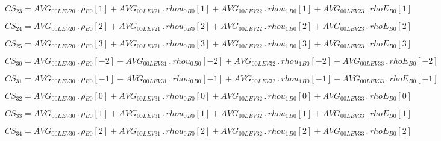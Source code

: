 \documentclass{article}
\begin{document}
\begin{dmath}CS_{23} = AVG_{0 0 LEV 20} \,.\, {\rho{_{B0}}}[{1}] + AVG_{0 0 LEV 21} \,.\, {rhou_{0}{_{B0}}}[{1}] + AVG_{0 0 LEV 22} \,.\, {rhou_{1}{_{B0}}}[{1}] + AVG_{0 0 LEV 23} \,.\, {rhoE{_{B0}}}[{1}]\end{dmath}

\begin{dmath}CS_{24} = AVG_{0 0 LEV 20} \,.\, {\rho{_{B0}}}[{2}] + AVG_{0 0 LEV 21} \,.\, {rhou_{0}{_{B0}}}[{2}] + AVG_{0 0 LEV 22} \,.\, {rhou_{1}{_{B0}}}[{2}] + AVG_{0 0 LEV 23} \,.\, {rhoE{_{B0}}}[{2}]\end{dmath}

\begin{dmath}CS_{25} = AVG_{0 0 LEV 20} \,.\, {\rho{_{B0}}}[{3}] + AVG_{0 0 LEV 21} \,.\, {rhou_{0}{_{B0}}}[{3}] + AVG_{0 0 LEV 22} \,.\, {rhou_{1}{_{B0}}}[{3}] + AVG_{0 0 LEV 23} \,.\, {rhoE{_{B0}}}[{3}]\end{dmath}

\begin{dmath}CS_{30} = AVG_{0 0 LEV 30} \,.\, {\rho{_{B0}}}[{-2}] + AVG_{0 0 LEV 31} \,.\, {rhou_{0}{_{B0}}}[{-2}] + AVG_{0 0 LEV 32} \,.\, {rhou_{1}{_{B0}}}[{-2}] + AVG_{0 0 LEV 33} \,.\, {rhoE{_{B0}}}[{-2}]\end{dmath}

\begin{dmath}CS_{31} = AVG_{0 0 LEV 30} \,.\, {\rho{_{B0}}}[{-1}] + AVG_{0 0 LEV 31} \,.\, {rhou_{0}{_{B0}}}[{-1}] + AVG_{0 0 LEV 32} \,.\, {rhou_{1}{_{B0}}}[{-1}] + AVG_{0 0 LEV 33} \,.\, {rhoE{_{B0}}}[{-1}]\end{dmath}

\begin{dmath}CS_{32} = AVG_{0 0 LEV 30} \,.\, {\rho{_{B0}}}[{0}] + AVG_{0 0 LEV 31} \,.\, {rhou_{0}{_{B0}}}[{0}] + AVG_{0 0 LEV 32} \,.\, {rhou_{1}{_{B0}}}[{0}] + AVG_{0 0 LEV 33} \,.\, {rhoE{_{B0}}}[{0}]\end{dmath}

\begin{dmath}CS_{33} = AVG_{0 0 LEV 30} \,.\, {\rho{_{B0}}}[{1}] + AVG_{0 0 LEV 31} \,.\, {rhou_{0}{_{B0}}}[{1}] + AVG_{0 0 LEV 32} \,.\, {rhou_{1}{_{B0}}}[{1}] + AVG_{0 0 LEV 33} \,.\, {rhoE{_{B0}}}[{1}]\end{dmath}

\begin{dmath}CS_{34} = AVG_{0 0 LEV 30} \,.\, {\rho{_{B0}}}[{2}] + AVG_{0 0 LEV 31} \,.\, {rhou_{0}{_{B0}}}[{2}] + AVG_{0 0 LEV 32} \,.\, {rhou_{1}{_{B0}}}[{2}] + AVG_{0 0 LEV 33} \,.\, {rhoE{_{B0}}}[{2}]\end{dmath}
\end{document}
